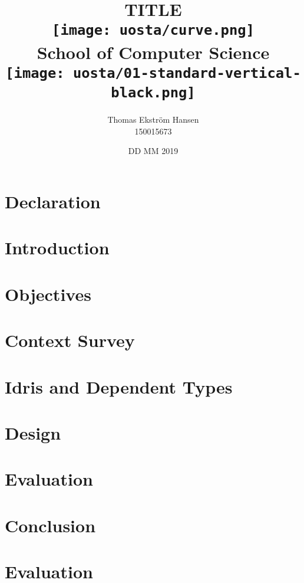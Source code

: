 \documentclass[12pt]{report}
\title{
    {TITLE}\\
    \vspace{2cm}
    {\texttt{[image: uosta/curve.png]}}\\
    {\fontfamily{ppl}\selectfont\large School of Computer Science}\\
    \vspace{-0.8cm}
    {\texttt{[image: uosta/01-standard-vertical-black.png]}}\\
    \vspace{-2cm}
}
\author{
    {Thomas Ekstr{\" o}m Hansen}\\
    {150015673}
}
\date{DD MM 2019}
\begin{document}
    \maketitle
    
    \chapter*{Declaration}
    
    
    \tableofcontents
    
    \chapter{Introduction}
    
    
    \chapter{Objectives}
    
    
    \chapter{Context Survey}
    
    
    \chapter{Idris and Dependent Types}
    
        
    \chapter{Design}
    
    
    \chapter{Evaluation}
    
        
    \chapter{Conclusion}
    
    
    
    
    
    \appendix
    
    \chapter{Evaluation}\label{app:evaln}
    
    
\end{document}
